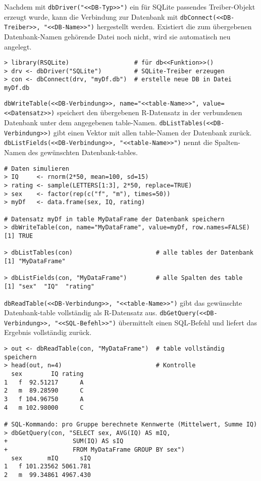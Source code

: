 Nachdem mit \lstinline!dbDriver("<<DB-Typ>>")! ein für SQLite passendes Treiber-Objekt erzeugt wurde, kann die Verbindung zur Datenbank mit \lstinline!dbConnect(<<DB-Treiber>>, "<<DB-Name>>")! hergestellt werden. Existiert die zum übergebenen Datenbank-Namen gehörende Datei noch nicht, wird sie automatisch neu angelegt.
\begin{lstlisting}
> library(RSQLite)                  # für db<<Funktion>>()
> drv <- dbDriver("SQLite")         # SQLite-Treiber erzeugen
> con <- dbConnect(drv, "myDf.db")  # erstelle neue DB in Datei myDf.db
\end{lstlisting}

\lstinline!dbWriteTable(<<DB-Verbindung>>, name="<<table-Name>>", value=<<Datensatz>>)! speichert den übergebenen R-Datensatz in der verbundenen Datenbank unter dem angegebenen table-Namen. \lstinline!dbListTables(<<DB-Verbindung>>)! gibt einen Vektor mit allen table-Namen der Datenbank zurück. \lstinline!dbListFields(<<DB-Verbindung>>, "<<table-Name>>")! nennt die Spalten-Namen des gewünschten Datenbank-tables.
\begin{lstlisting}
# Daten simulieren
> IQ     <- rnorm(2*50, mean=100, sd=15)
> rating <- sample(LETTERS[1:3], 2*50, replace=TRUE)
> sex    <- factor(rep(c("f", "m"), times=50))
> myDf   <- data.frame(sex, IQ, rating)

# Datensatz myDf in table MyDataFrame der Datenbank speichern
> dbWriteTable(con, name="MyDataFrame", value=myDf, row.names=FALSE)
[1] TRUE

> dbListTables(con)                       # alle tables der Datenbank
[1] "MyDataFrame"

> dbListFields(con, "MyDataFrame")        # alle Spalten des table
[1] "sex"  "IQ"  "rating"
\end{lstlisting}

\lstinline!dbReadTable(<<DB-Verbindung>>, "<<table-Name>>")! gibt das gewünschte Datenbank-table vollständig als R-Datensatz aus. \lstinline!dbGetQuery(<<DB-Verbindung>>, "<<SQL-Befehl>>")! übermittelt einen SQL-Befehl und liefert das Ergebnis vollständig zurück.
\begin{lstlisting}
> out <- dbReadTable(con, "MyDataFrame")  # table vollständig speichern
> head(out, n=4)                          # Kontrolle
  sex        IQ rating
1   f  92.51217      A
2   m  89.28590      C
3   f 104.96750      A
4   m 102.98000      C

# SQL-Kommando: pro Gruppe berechnete Kennwerte (Mittelwert, Summe IQ)
> dbGetQuery(con, "SELECT sex, AVG(IQ) AS mIQ,
+                  SUM(IQ) AS sIQ
+                  FROM MyDataFrame GROUP BY sex")
  sex       mIQ      sIQ
1   f 101.23562 5061.781
2   m  99.34861 4967.430
\end{lstlisting}

